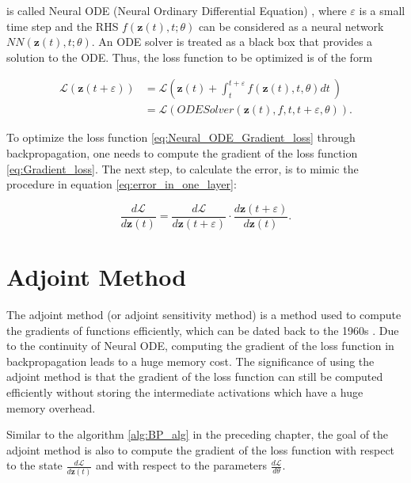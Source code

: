 \documentclass[
	parskip, 			   %
	twoside, 			   %
	DIV=14, 			   %
	BCOR=15.0mm, 		   %
	headsepline, 		   %
	open=right, 		   %
	captions=tableheading, %
	bibliography=totoc,    %
	numbers=noenddot       %
]{scrreprt}
\begin{document}
is called Neural ODE (Neural Ordinary Differential Equation) \cite{chen2018neural}, where $\varepsilon $ is a small time step and the RHS $f(\mathbf{z}(t), t; \theta)$ can be considered as a neural network $NN(\mathbf{z}(t), t; \theta)$. An ODE solver is treated as a black box that provides a solution to the ODE. Thus, the loss function to be optimized is of the form

\begin{equation}
    \label{eq:Neural_ODE_Gradient_loss}
    \begin{aligned}
    \mathcal{L}(\mathbf{z}(t+\varepsilon )) &= \mathcal{L}(\mathbf{z}(t) + \int_{t}^{t+\varepsilon } f(\mathbf{z}(t), t, \theta)dt \:)\\
    &= \mathcal{L}(ODESolver(\mathbf{z}(t), f, t, t+\varepsilon , \theta)).
    \end{aligned}
\end{equation}

To optimize the loss function \ref{eq:Neural_ODE_Gradient_loss} through backpropagation, one needs to compute the gradient of the loss function \ref{eq:Gradient_loss}. The next step, to calculate the error, is to mimic the procedure in equation \ref{eq:error_in_one_layer}:

\begin{equation}
    \label{eq:Neural_ODE_error}
    \frac{d\mathcal{L}}{d\mathbf{z}(t)} = \frac{d\mathcal{L}}{d\mathbf{z}(t+\varepsilon )} \cdot \frac{d\mathbf{z}(t+\varepsilon )}{d\mathbf{z}(t)}.
\end{equation}

\section{Adjoint Method}
The adjoint method (or adjoint sensitivity method) is a method used to compute the gradients of functions efficiently, which can be dated back to the 1960s \cite{boltyanskiy1962mathematical}. Due to the continuity of Neural ODE, computing the gradient of the loss function in backpropagation leads to a huge memory cost. The significance of using the adjoint method is that the gradient of the loss function can still be computed efficiently without storing the intermediate activations which have a huge memory overhead.

Similar to the algorithm \ref{alg:BP_alg} in the preceding chapter, the goal of the adjoint method is also to compute the gradient of the loss function with respect to the state $\frac{d\mathcal{L}}{d\mathbf{z}(t)}$ and with respect to the parameters $\frac{d\mathcal{L}}{d\theta}$.
\end{document}

